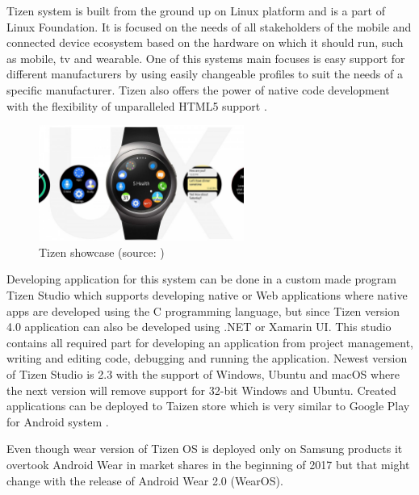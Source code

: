 Tizen system is built from the ground up on Linux platform and is a part of Linux Foundation. It is focused on the needs of all stakeholders of the mobile and connected device ecosystem based on the hardware on which it should run, such as mobile, tv and wearable. One of this systems main focuses is easy support for different manufacturers by using easily changeable profiles to suit the needs of a specific manufacturer. Tizen also offers the power of native code development with the flexibility of unparalleled HTML5 support \cite{TizenAbout}.

\begin{figure}[H]
	\begin{centering}
		\includegraphics[width=0.6\textwidth]{img/tizen}
		\par\end{centering}
	\caption{Tizen showcase (source: \cite{NFFAWSW})\label{fig:Tizen}}
	\label{fig05c04}
\end{figure}

Developing application for this system can be done in a custom made program Tizen Studio which supports developing native or Web applications where native apps are developed using the C programming language, but since Tizen version 4.0 application can also be developed using .NET or Xamarin UI. This studio contains all required part for developing an application from project management, writing and editing code, debugging and running the application. Newest version of Tizen Studio is 2.3 with the support of Windows, Ubuntu and macOS where the next version will remove support for 32-bit Windows and Ubuntu. Created applications can be deployed to Taizen store which is very similar to Google Play for Android system \cite{TizenDev}.

Even though wear version of Tizen OS is deployed only on Samsung products it overtook Android Wear in market shares in the beginning of 2017 but that might change with the release of Android Wear 2.0 (WearOS). 

